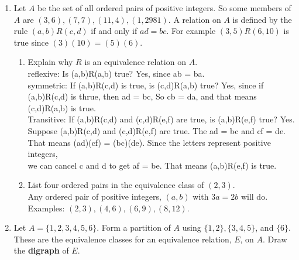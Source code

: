 \documentclass[11pt]{amsart}
\begin{document}
\begin{enumerate}
\item Let $A$ be the set of all ordered pairs of positive integers.
So some members of $A$ are $(3,6),  (7,7), (11,4), (1,2981)$. A relation on $A$ is defined by the rule 
$(a,b) R (c,d)$ if and only if $ad = bc$. For example $(3,5) R (6,10)$ is true since $(3)(10)=(5)(6)$.\\[3pt]
\begin{enumerate}
\item Explain why $R$ is an equivalence relation on $A$.\\[3pt]
{\color{blue}
reflexive: Is (a,b)R(a,b) true? Yes, since ab = ba.\\
symmetric: If (a,b)R(c,d) is true, is (c,d)R(a,b) true? Yes, since if
(a,b)R(c,d) is thrue, then ad = bc, So cb = da, and that means (c,d)R(a,b) is true.\\
Transitive: If (a,b)R(c,d) and (c,d)R(e,f) are true, is (a,b)R(e,f) true? Yes.\\
Suppose (a,b)R(c,d) and (c,d)R(e,f) are true. The ad = bc and cf = de. That
means (ad)(cf) = (bc)(de). Since the letters represent positive integers,\\
we can cancel c and d to get af = be. That means (a,b)R(e,f) is true.\\[3pt]
}

\item List four ordered pairs in the equivalence class of $(2,3)$.\\[3pt] 
{\color{blue}
Any ordered pair of positive integers, $(a,b)$ with $3a=2b$ will do.\\
 Examples:
$(2,3), (4,6), (6,9), (8,12)$.\\[5pt]
}
\end{enumerate}


\item   Let $A=\{1,2,3,4,5,6\}$. 
Form a partition of $A$ using $\{1, 2\}, \{3, 4, 5\}$, and $\{6\}$.
These are the equivalence classes for an equivalence relation, $E$, on $A$.
 Draw the  {\bf digraph} of $E$.\\[3pt]
 
 {\color{blue}
 }
\end{enumerate}
\end{document}
